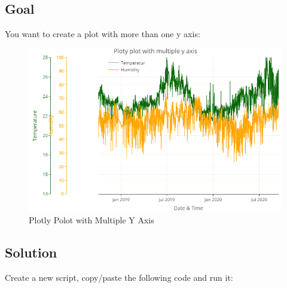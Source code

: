 \documentclass[
  a4paperpaper,
]{book}
\begin{document}
\hypertarget{goal-25}{%
\subsection{Goal}\label{goal-25}}

You want to create a plot with more than one y axis:

\begin{figure}
\includegraphics[width=0.7\linewidth]{images/miscPlotlyMultipleYAxis} \caption{Plotly Polot with Multiple Y Axis}\label{fig:unnamed-chunk-36}
\end{figure}

\newpage

\hypertarget{solution-25}{%
\subsection{Solution}\label{solution-25}}

Create a new script, copy/paste the following code and run it:
\end{document}
